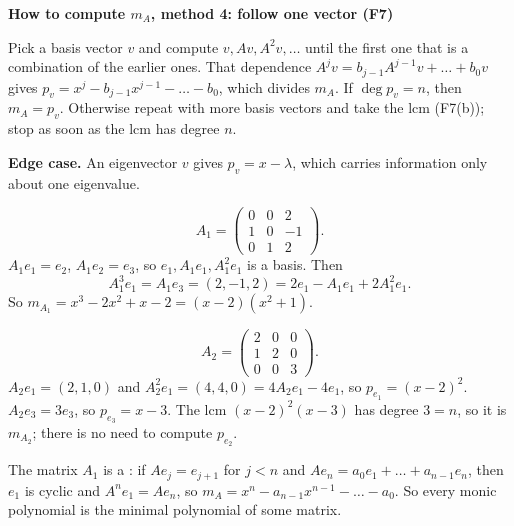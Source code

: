 \documentclass[10pt]{scrartcl}
\newenvironment{methodbox}[1]{\begin{mdframed}[style=mdbluebox,linecolor=NavyBlue,backgroundcolor=NavyBlue!3]\textbf{\color{NavyBlue}#1}\par\vspace{2pt}}{\end{mdframed}}
\begin{document}
\begin{methodbox}{How to compute $m_A$, method 4: follow one vector (F7)}
\begin{enumerate}[label=\arabic*.,leftmargin=1.5em,itemsep=2pt,topsep=2pt]
  \ii Pick a basis vector $v$ and compute $v,Av,A^2v,\dots$ until the first one that is a combination of the earlier ones.
  \ii That dependence $A^jv=b_{j-1}A^{j-1}v+\dots+b_0v$ gives $p_v=x^j-b_{j-1}x^{j-1}-\dots-b_0$, which divides $m_A$.
  \ii If $\deg p_v=n$, then $m_A=p_v$. Otherwise repeat with more basis vectors and take the lcm (F7(b)); stop as soon as the lcm has degree $n$.
\end{enumerate}
\textbf{Edge case.} An eigenvector $v$ gives $p_v=x-\lambda$, which carries information only about one eigenvalue.
\end{methodbox}
\begin{example*}
  \[ A_1=\begin{pmatrix}0&0&2\\1&0&-1\\0&1&2\end{pmatrix}. \]
  $A_1e_1=e_2$, $A_1e_2=e_3$, so $e_1,A_1e_1,A_1^2e_1$ is a basis. Then
  \[ A_1^3e_1=A_1e_3=(2,-1,2)=2e_1-A_1e_1+2A_1^2e_1. \]
  So $m_{A_1}=x^3-2x^2+x-2=(x-2)(x^2+1)$.
\end{example*}
\begin{example*}
  \[ A_2=\begin{pmatrix}2&0&0\\1&2&0\\0&0&3\end{pmatrix}. \]
  $A_2e_1=(2,1,0)$ and $A_2^2e_1=(4,4,0)=4A_2e_1-4e_1$, so $p_{e_1}=(x-2)^2$. $A_2e_3=3e_3$, so $p_{e_3}=x-3$. The lcm $(x-2)^2(x-3)$ has degree $3=n$, so it is $m_{A_2}$; there is no need to compute $p_{e_2}$.
\end{example*}
The matrix $A_1$ is a : if $Ae_j=e_{j+1}$ for $j<n$ and $Ae_n=a_0e_1+\dots+a_{n-1}e_n$, then $e_1$ is cyclic and $A^ne_1=Ae_n$, so $m_A=x^n-a_{n-1}x^{n-1}-\dots-a_0$. So every monic polynomial is the minimal polynomial of some matrix.
\end{document}
